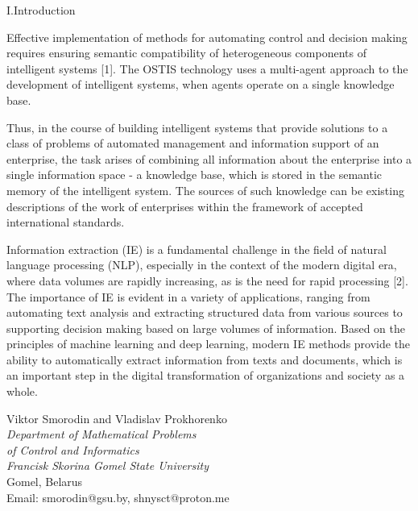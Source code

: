 \documentclass [11pt,a4paper]{article}
\begin{document}
\begin{multicols}{2}
\fontsize{11}{12}\selectfont
\vspace{0cm}
\begin{center}
    I.Introduction
\end{center}
    \par Effective implementation of methods for automating
control and decision making requires ensuring semantic
compatibility of heterogeneous components of intelligent
systems [1]. The OSTIS technology uses a multi-agent
approach to the development of intelligent systems, when
agents operate on a single knowledge base.\par
Thus, in the course of building intelligent systems that
provide solutions to a class of problems of automated
management and information support of an enterprise,
the task arises of combining all information about the
enterprise into a single information space - a knowledge
base, which is stored in the semantic memory of the
intelligent system. The sources of such knowledge can
be 
existing descriptions of the work of enterprises within
the framework of accepted international standards.\par
Information extraction (IE) is a fundamental challenge
in the field of natural language processing (NLP), especially in the context of the modern digital era, where
data volumes are rapidly increasing, as is the need for
rapid processing [2]. The importance of IE is evident
in a variety of applications, ranging from automating
text analysis and extracting structured data from various
sources to supporting decision making based on large
volumes of information. Based on the principles of
machine learning and deep learning, modern IE methods
provide the ability to automatically extract information
from texts and documents, which is an important step in 
the digital transformation of organizations and society as
a whole.

 \begin{center} \normalsize{Viktor Smorodin and Vladislav Prokhorenko}\\
\textit{Department of Mathematical Problems\\
of Control and Informatics\\
Francisk Skorina Gomel State University} \\
Gomel, Belarus\\
\small Email: smorodin@gsu.by, shnysct@proton.me\end{center}


    


\end{multicols}
\end{document}
